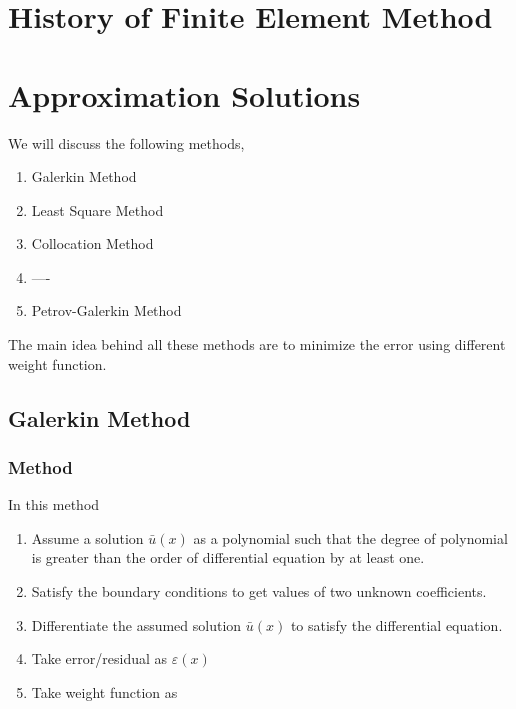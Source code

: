 \documentclass[../main-sheet.tex]{subfiles}
\begin{document}
\chapter{History of Finite Element Method}
\chapter{Approximation Solutions}
We will discuss the following methods,
\begin{enumerate}[label=(\roman*)]
    \item Galerkin Method
    \item Least Square Method
    \item Collocation Method
    \item ----
    \item Petrov-Galerkin Method
\end{enumerate}
The main idea behind all these methods are to minimize the error using different weight function.
\section{Galerkin Method}
\subsection{Method}
In this method 
\begin{enumerate}[label=Step (\roman*):]
    \item Assume a solution \(\bar{u}(x)\) as a polynomial such that the degree of polynomial is greater than the order of differential equation by at least one.
    \item Satisfy the boundary conditions to get values of two unknown coefficients.
    \item Differentiate the assumed solution \(\bar{u}(x)\) to satisfy the differential equation.
    \item Take error/residual as \(\varepsilon(x)\)
    \item Take weight function as  
\end{enumerate}
\end{document}
